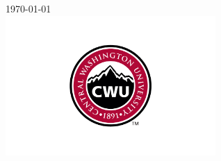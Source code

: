 \documentclass[12pt]{article}
\begin{document}
\begin{titlepage}
        
        \vspace{2cm}
        {\large \today}\\ %
        
        
        \includegraphics[width=8cm]{CWU-Logo.png}\\[.5cm] %
        
        
        \vfill %
        
    \end{titlepage}
\end{document}
